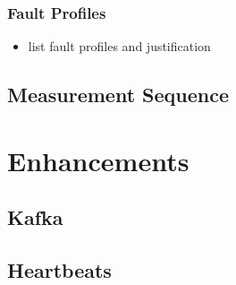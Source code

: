 \subsubsection{Fault Profiles}

\begin{itemize}
	\item list fault profiles and justification
\end{itemize}

\subsection{Measurement Sequence}

\section{Enhancements}

\subsection{Kafka}

\subsection{Heartbeats}
